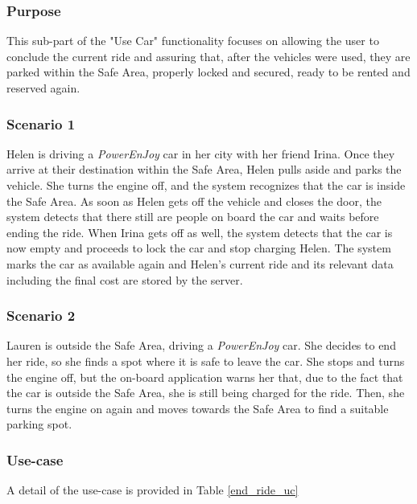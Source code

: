 \subsubsection{Purpose}
This sub-part of the "Use Car" functionality focuses on allowing the user to conclude the current ride and assuring that, after the vehicles were used, they are parked within the Safe Area, properly locked and secured, ready to be rented and reserved again.

\subsubsection{Scenario 1}
Helen is driving a \emph{PowerEnJoy} car in her city with her friend Irina. Once they arrive at their destination within the Safe Area, Helen pulls aside and parks the vehicle. She turns the engine off, and the system recognizes that the car is inside the Safe Area. As soon as Helen gets off the vehicle and closes the door, the system detects that there still are people on board the car and waits before ending the ride. When Irina gets off as well, the system detects that the car is now empty and proceeds to lock the car and stop charging Helen. The system marks the car as available again and Helen's current ride and its relevant data including the final cost are stored by the server.

\subsubsection{Scenario 2}
Lauren is outside the Safe Area, driving a \emph{PowerEnJoy} car. She decides to end her ride, so she finds a spot where it is safe to leave the car. She stops and turns the engine off, but the on-board application warns her that, due to the fact that the car is outside the Safe Area, she is still being charged for the ride. Then, she turns the engine on again and moves towards the Safe Area to find a suitable parking spot.

\subsubsection{Use-case}
A detail of the use-case is provided in Table \ref{end_ride_uc}

